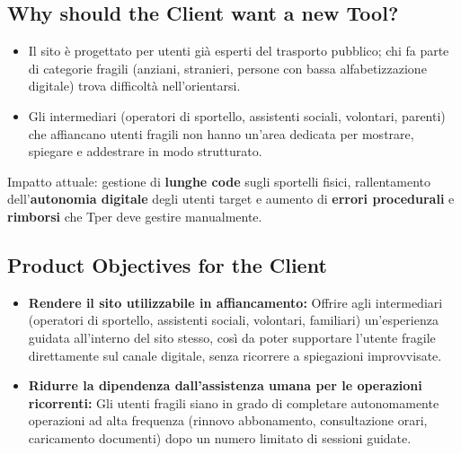 \documentclass[11pt,a4paper]{article}
\begin{document}
\subsection{Why should the Client want a new Tool?}
\begin{itemize}[leftmargin=*]
    \item Il sito è progettato per utenti già esperti del trasporto pubblico; chi fa parte di categorie fragili  (anziani, stranieri, persone con bassa alfabetizzazione digitale) trova difficoltà nell'orientarsi.
    \item Gli intermediari  (operatori di sportello, assistenti sociali, volontari, parenti) che affiancano utenti fragili non hanno un'area dedicata per mostrare, spiegare e addestrare in modo strutturato.
\end{itemize}
    Impatto attuale: gestione di \textbf{lunghe code} sugli sportelli fisici, rallentamento dell'\textbf{autonomia digitale} degli utenti target e aumento di \textbf{errori procedurali} e \textbf{rimborsi} che Tper deve gestire manualmente.

\subsection{Product Objectives for the Client}

\begin{itemize}[leftmargin=*]
    \item \textbf{Rendere il sito utilizzabile in affiancamento:} Offrire agli intermediari (operatori di sportello, assistenti sociali, volontari, familiari) un'esperienza guidata all'interno del sito stesso, così da poter supportare l'utente fragile direttamente sul canale digitale, senza ricorrere a spiegazioni improvvisate.

    \item \textbf{Ridurre la dipendenza dall'assistenza umana per le operazioni ricorrenti:} Gli utenti fragili siano in grado di completare autonomamente operazioni ad alta frequenza (rinnovo abbonamento, consultazione orari, caricamento documenti) dopo un numero limitato di sessioni guidate.
    
\end{itemize}
\end{document}
